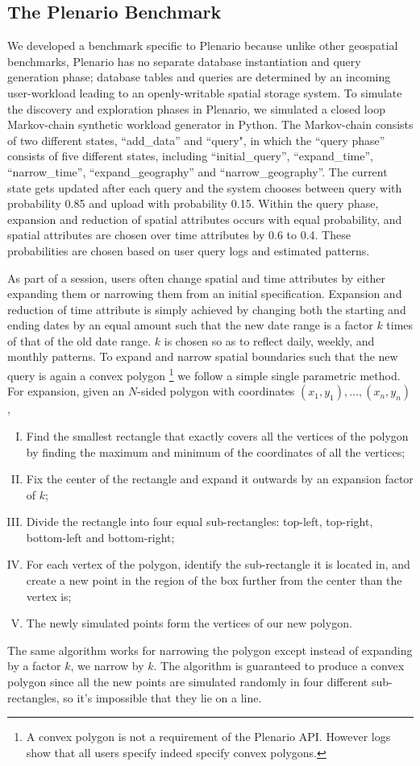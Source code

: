 \documentclass[11pt]{article}
\begin{document}
\subsection{The Plenario Benchmark}
We developed a benchmark specific to Plenario because unlike other geospatial benchmarks, Plenario has no separate database instantiation and query generation phase; database tables and queries are determined by an incoming user-workload leading to an openly-writable spatial storage system. To simulate the discovery and exploration phases in Plenario, we simulated a closed loop Markov-chain synthetic workload generator in Python. The  Markov-chain consists of two different states, ``add\_data'' and ``query", in which the ``query phase'' consists of five different states, including ``initial\_query'', ``expand\_time'', ``narrow\_time'', ``expand\_geography'' and ``narrow\_geography''.
The current state gets updated after each query and the system chooses between query with probability 0.85 and upload with probability 0.15. Within the query phase, expansion and reduction of spatial attributes occurs with equal probability, and spatial attributes are chosen over time attributes by 0.6 to 0.4. These probabilities are chosen based on user query logs and estimated patterns. 

As part of a session, users often change spatial and time attributes by either expanding them or narrowing them from an initial specification. Expansion and reduction of time attribute is simply achieved by changing both the starting and ending dates by an equal amount such that the new date range is a factor $k$ times of that of the old date range. $k$ is chosen so as to reflect daily, weekly, and monthly patterns. To expand and narrow spatial boundaries such that the new query is again a convex polygon \footnote{A convex polygon is not a requirement of the Plenario API. However logs show that all users specify indeed specify convex polygons.} we follow a simple single parametric method. For expansion, given an $N$-sided polygon with coordinates $(x_1,y_1),\ldots,(x_n, y_n)$,
\begin{enumerate}[I.]
\itemsep0em 
 \item Find the smallest rectangle that exactly covers all the vertices of the polygon by finding the maximum and minimum of the coordinates of all the vertices; 
 \item Fix the center of the rectangle and expand it outwards by an expansion factor of $k$; 
 \item Divide the rectangle into four equal sub-rectangles: top-left, top-right, bottom-left and bottom-right; 
 \item For each vertex of the polygon, identify the sub-rectangle it is located in, and create a new point in the region of the box further from the center than the vertex is;
 \item The newly simulated points form the vertices of our new polygon. 
 \end{enumerate}
 The same algorithm works for narrowing the polygon except instead of expanding by a factor $k$, we narrow by $k$. The algorithm is guaranteed to produce a convex polygon since all the new points are simulated randomly in four different sub-rectangles, so it's impossible that they lie on a line.
\end{document}
